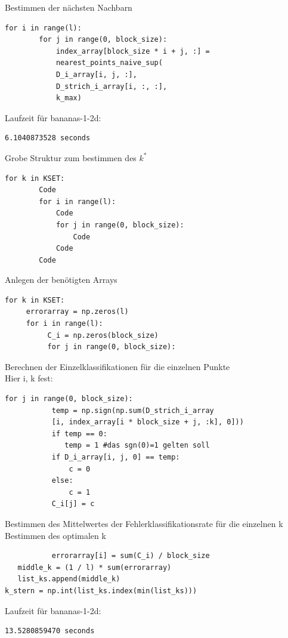 \documentclass{beamer}
\begin{document}
\begin{frame}[fragile]
Bestimmen der nächsten Nachbarn
\begin{verbatim}
for i in range(l):
        for j in range(0, block_size):
            index_array[block_size * i + j, :] =
            nearest_points_naive_sup(
            D_i_array[i, j, :],
            D_strich_i_array[i, :, :], 
            k_max)
\end{verbatim}
Laufzeit für bananas-1-2d:
\begin{verbatim}
6.1040873528 seconds
\end{verbatim}
\end{frame}

\begin{frame}[fragile]
Grobe Struktur zum bestimmen des $k^*$
\begin{verbatim}
for k in KSET:
        Code
        for i in range(l):
            Code
            for j in range(0, block_size):
                Code
            Code
        Code
\end{verbatim}
\end{frame}

\begin{frame}[fragile]
Anlegen der benötigten Arrays
\begin{verbatim}
for k in KSET:
     errorarray = np.zeros(l)
     for i in range(l):
          C_i = np.zeros(block_size)
          for j in range(0, block_size):
\end{verbatim}
\end{frame}

\begin{frame}[fragile]
Berechnen der Einzelklassifikationen für die einzelnen Punkte\\
Hier i, k fest:
\begin{verbatim}
for j in range(0, block_size):
           temp = np.sign(np.sum(D_strich_i_array
           [i, index_array[i * block_size + j, :k], 0]))
           if temp == 0:
              temp = 1 #das sgn(0)=1 gelten soll
           if D_i_array[i, j, 0] == temp:
               c = 0
           else:
               c = 1
           C_i[j] = c
\end{verbatim}
\end{frame}


\begin{frame}[fragile]
Bestimmen des Mittelwertes der Fehlerklassifikationsrate für die einzelnen k\\
Bestimmen des optimalen k
\begin{verbatim}    	   errorarray[i] = sum(C_i) / block_size
   middle_k = (1 / l) * sum(errorarray)
   list_ks.append(middle_k)
k_stern = np.int(list_ks.index(min(list_ks)))
\end{verbatim}
Laufzeit für bananas-1-2d:
\begin{verbatim}
13.5280859470 seconds
\end{verbatim}
\end{frame}
\end{document}
